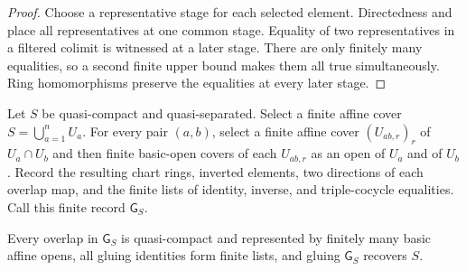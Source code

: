 \begin{proof}
  Choose a representative stage for each selected element.  Directedness and
   place all representatives at
  one common stage.  Equality of two representatives in a filtered colimit is
  witnessed at a later stage.  There are only finitely many equalities, so a
  second finite upper bound makes them all true simultaneously.  Ring
  homomorphisms preserve the equalities at every later stage.
\end{proof}

\begin{definition}
  \label{def:nagata-finite-affine-gluing-presentation}

  Let $S$ be quasi-compact and quasi-separated.  Select a finite affine cover
  $S=\bigcup_{a=1}^nU_a$.  For every pair $(a,b)$, select a finite affine
  cover $(U_{ab,r})_r$ of $U_a\cap U_b$ and then finite basic-open covers of
  each $U_{ab,r}$ as an open of $U_a$ and of $U_b$.  Record the resulting
  chart rings, inverted elements, two directions of each overlap map, and the
  finite lists of identity, inverse, and triple-cocycle equalities.  Call this
  finite record $\mathsf G_S$.
\end{definition}

\begin{lemma}
  \label{lemma:nagata-finite-affine-gluing-presentation}

  Every overlap in $\mathsf G_S$ is quasi-compact and represented by finitely
  many basic affine opens, all gluing identities form finite lists, and
  gluing $\mathsf G_S$ recovers $S$.
\end{lemma}

